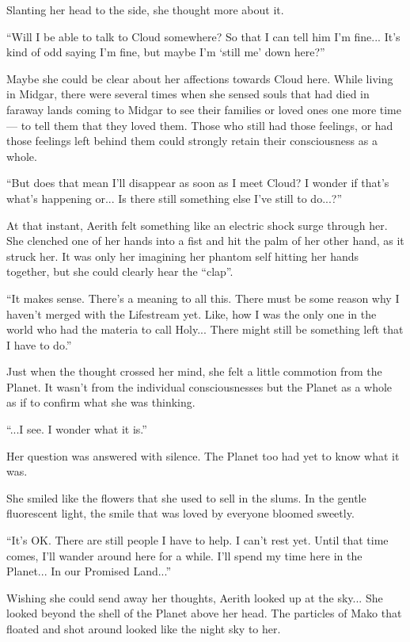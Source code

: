 \documentclass[oneside]{book}
\begin{document}
Slanting her head to the side, she thought more about it.

“Will I be able to talk to Cloud somewhere? So that I can tell him I'm fine... It's kind of odd saying I'm fine, but maybe I'm ‘still me' down here?”

Maybe she could be clear about her affections towards Cloud here. While living in Midgar, there were several times when she sensed souls that had died in faraway lands coming to Midgar to see their families or loved ones one more time— to tell them that they loved them. Those who still had those feelings, or had those feelings left behind them could strongly retain their consciousness as a whole.

“But does that mean I'll disappear as soon as I meet Cloud? I wonder if that's what's happening or... Is there still something else I've still to do...?”

At that instant, Aerith felt something like an electric shock surge through her. She clenched one of her hands into a fist and hit the palm of her other hand, as it struck her. It was only her imagining her phantom self hitting her hands together, but she could clearly hear the “clap”.

“It makes sense. There's a meaning to all this. There must be some reason why I haven't merged with the Lifestream yet. Like, how I was the only one in the world who had the materia to call Holy... There might still be something left that I have to do.”

Just when the thought crossed her mind, she felt a little commotion from the Planet. It wasn't from the individual consciousnesses but the Planet as a whole as if to confirm what she was thinking.

“...I see. I wonder what it is.”

Her question was answered with silence. The Planet too had yet to know what it was.

She smiled like the flowers that she used to sell in the slums. In the gentle fluorescent light, the smile that was loved by everyone bloomed sweetly.

“It's OK. There are still people I have to help. I can't rest yet. Until that time comes, I'll wander around here for a while. I'll spend my time here in the Planet... In our Promised Land...”

Wishing she could send away her thoughts, Aerith looked up at the sky... She looked beyond the shell of the Planet above her head. The particles of Mako that floated and shot around looked like the night sky to her.
\end{document}
